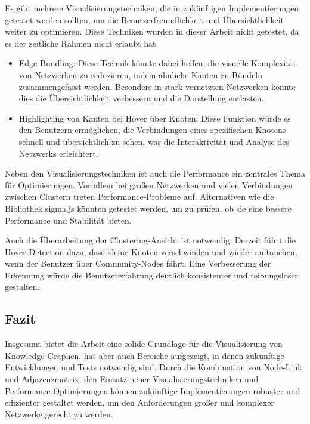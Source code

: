 Es gibt mehrere Visualisierungstechniken, die in zukünftigen Implementierungen getestet werden sollten, um die Benutzerfreundlichkeit und Übersichtlichkeit weiter zu optimieren. Diese Techniken wurden in dieser Arbeit nicht getestet, da es der zeitliche Rahmen nicht erlaubt hat.

\begin{itemize}
    \item Edge Bundling: Diese Technik könnte dabei helfen, die visuelle Komplexität von Netzwerken zu reduzieren, indem ähnliche Kanten zu Bündeln zusammengefasst werden. Besonders in stark vernetzten Netzwerken könnte dies die Übersichtlichkeit verbessern und die Darstellung entlasten.
    \item Highlighting von Kanten bei Hover über Knoten: Diese Funktion würde es den Benutzern ermöglichen, die Verbindungen eines spezifischen Knotens schnell und übersichtlich zu sehen, was die Interaktivität und Analyse des Netzwerks erleichtert.
\end{itemize}

Neben den Visualisierungstechniken ist auch die Performance ein zentrales Thema für Optimierungen. Vor allem bei großen Netzwerken und vielen Verbindungen zwischen Clustern treten Performance-Probleme auf. Alternativen wie die Bibliothek sigma.js könnten getestet werden, um zu prüfen, ob sie eine bessere Performance und Stabilität bieten.

Auch die Überarbeitung der Clustering-Ansicht ist notwendig. Derzeit führt die Hover-Detection dazu, dass kleine Knoten verschwinden und wieder auftauchen, wenn der Benutzer über Community-Nodes fährt. Eine Verbesserung der Erkennung würde die Benutzererfahrung deutlich konsistenter und reibungsloser gestalten.

\subsection{Fazit}

Insgesamt bietet die Arbeit eine solide Grundlage für die Visualisierung von Knowledge Graphen, hat aber auch Bereiche aufgezeigt, in denen zukünftige Entwicklungen und Tests notwendig sind. Durch die Kombination von Node-Link und Adjazenzmatrix, den Einsatz neuer Visualisierungstechniken und Performance-Optimierungen können zukünftige Implementierungen robuster und effizienter gestaltet werden, um den Anforderungen großer und komplexer Netzwerke gerecht zu werden.